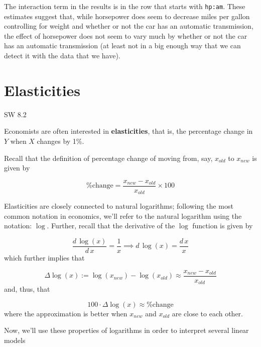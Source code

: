 \documentclass[
  letterpaper,
  DIV=11,
  numbers=noendperiod]{scrreprt}
\begin{document}
The interaction term in the results is in the row that starts with
\texttt{hp:am}. These estimates suggest that, while horsepower does seem
to decrease miles per gallon controlling for weight and whether or not
the car has an automatic transmission, the effect of horsepower does not
seem to vary much by whether or not the car has an automatic
transmission (at least not in a big enough way that we can detect it
with the data that we have).

\section{Elasticities}\label{elasticities}

SW 8.2

Economists are often interested in \textbf{elasticities}, that is, the
percentage change in \(Y\) when \(X\) changes by 1\%.

Recall that the definition of percentage change of moving from, say,
\(x_{old}\) to \(x_{new}\) is given by

\[
  \textrm{\% change} = \frac{x_{new} - x_{old}}{x_{old}} \times 100
\]

Elasticities are closely connected to natural logarithms; following the
most common notation in economics, we'll refer to the natural logarithm
using the notation: \(\log\). Further, recall that the derivative of the
\(\log\) function is given by

\[
  \frac{d \, \log(x)}{d \, x} = \frac{1}{x} \implies d\, \log(x) = \frac{d \, x}{x}
\] which further implies that

\[
  \Delta \log(x) := \log(x_{new}) - \log(x_{old}) \approx \frac{x_{new} - x_{old}}{x_{old}}
\] and, thus, that

\[
  100 \cdot \Delta \log(x) \approx \textrm{\% change}
\] where the approximation is better when \(x_{new}\) and \(x_{old}\)
are close to each other.

Now, we'll use these properties of logarithms in order to interpret
several linear models
\end{document}

